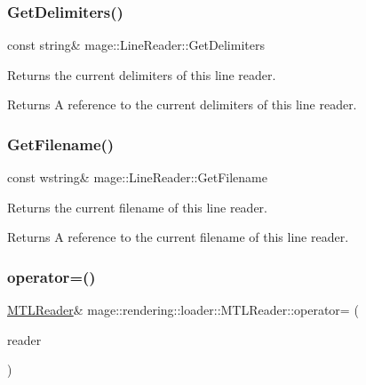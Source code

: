 \subsubsection{\texorpdfstring{Get\+Delimiters()}{GetDelimiters()}}
{\footnotesize\ttfamily const string\& mage\+::\+Line\+Reader\+::\+Get\+Delimiters\hspace{0.3cm}{\ttfamily [noexcept]}}

Returns the current delimiters of this line reader.

\begin{DoxyReturn}{Returns}
A reference to the current delimiters of this line reader. 
\end{DoxyReturn}
\mbox{\label{classmage_1_1rendering_1_1loader_1_1_m_t_l_reader_a682ed8030c99a62d4409a01f9efa6d6b}} 
\subsubsection{\texorpdfstring{Get\+Filename()}{GetFilename()}}
{\footnotesize\ttfamily const wstring\& mage\+::\+Line\+Reader\+::\+Get\+Filename\hspace{0.3cm}{\ttfamily [noexcept]}}

Returns the current filename of this line reader.

\begin{DoxyReturn}{Returns}
A reference to the current filename of this line reader. 
\end{DoxyReturn}
\mbox{\label{classmage_1_1rendering_1_1loader_1_1_m_t_l_reader_a1153606ce103d9f667726cf5f66a88d1}} 
\subsubsection{\texorpdfstring{operator=()}{operator=()}\hspace{0.1cm}{\footnotesize\ttfamily [1/2]}}
{\footnotesize\ttfamily \mbox{\hyperlink{classmage_1_1rendering_1_1loader_1_1_m_t_l_reader}{M\+T\+L\+Reader}}\& mage\+::rendering\+::loader\+::\+M\+T\+L\+Reader\+::operator= (\begin{DoxyParamCaption}\item[{const \mbox{\hyperlink{classmage_1_1rendering_1_1loader_1_1_m_t_l_reader}{M\+T\+L\+Reader}} \&}]{reader }\end{DoxyParamCaption})\hspace{0.3cm}{\ttfamily [delete]}}

